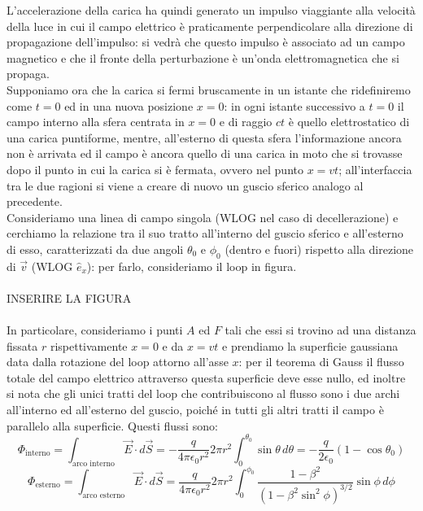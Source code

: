 L'accelerazione della carica ha quindi generato un impulso viaggiante alla velocità della luce in cui il campo elettrico è praticamente perpendicolare alla direzione di propagazione dell'impulso: si vedrà che questo impulso è associato ad un campo magnetico e che il fronte della perturbazione è un'onda elettromagnetica che si propaga. \\ 
Supponiamo ora che la carica si fermi bruscamente in un istante che ridefiniremo come $ t = 0 $ ed in una nuova posizione $ x = 0 $: in ogni istante successivo a $ t = 0 $ il campo interno alla sfera centrata in $ x = 0 $ e di raggio $ ct $ è quello elettrostatico di una carica puntiforme, mentre, all'esterno di questa sfera l'informazione ancora non è arrivata ed il campo è ancora quello di una carica in moto che si trovasse dopo il punto in cui la carica si è fermata, ovvero nel punto $ x = vt $; all'interfaccia tra le due ragioni si viene a creare di nuovo un guscio sferico analogo al precedente. \\ 
%
Consideriamo una linea di campo singola (WLOG nel caso di decellerazione) e cerchiamo la relazione tra il suo tratto all'interno del guscio sferico e all'esterno di esso, caratterizzati da due angoli $ \theta_0 $ e $ \phi_0 $ (dentro e fuori) rispetto alla direzione di $ \vec{v} $ (WLOG $ \hat{e}_x $): per farlo, consideriamo il loop in figura. \\ 
%
%
%
\hbox{} \\ INSERIRE LA FIGURA \\ \hbox{} \\ 
%
%
%
In particolare, consideriamo i punti $ A $ ed $ F $ tali che essi si trovino ad una distanza fissata $ r $ rispettivamente $ x = 0 $ e da $ x = vt $ e prendiamo la superficie gaussiana data dalla rotazione del loop attorno all'asse $ x $: per il teorema di Gauss il flusso totale del campo elettrico attraverso questa superficie deve esse nullo, ed inoltre si nota che gli unici tratti del loop che contribuiscono al flusso sono i due archi all'interno ed all'esterno del guscio, poiché in tutti gli altri tratti il campo è parallelo alla superficie. Questi flussi sono:
\begin{equation}
	\Phi_{\text{interno}} = \int_{\text{arco interno}} \vec{E}\cdot d\vec{S} = -\frac{q}{4\pi\epsilon_0 r^2} 2\pi r^2 \int_0^{\theta_0} \sin\theta \,d\theta = -\frac{q}{2\epsilon_0} (1-\cos\theta_0)
	\label{eq:33}
\end{equation}
\begin{equation}
	\Phi_{\text{esterno}} = \int_{\text{arco esterno}} \vec{E}\cdot d\vec{S} = \frac{q}{4\pi\epsilon_0 r^2} 2\pi r^2 \int_0^{\phi_0} \displaystyle\frac{1 - \beta^2}{(1 - \beta^2 \sin^2\phi)^{3/2}} \sin\phi \,d\phi
	\label{eq:34}
\end{equation}
